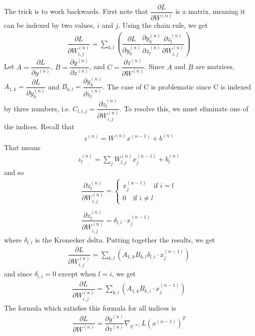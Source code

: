 \documentclass{article}
\begin{document}
 	The trick is to work backwards. First note that \( \dfrac{\partial L}{\partial W^{(n)}} \) is a matrix, meaning it can be indexed by two values, \( i \) and \( j \). Using the chain rule, we get 
 	\begin{gather*}
 		\dfrac{\partial L}{\partial W^{(n)}_{i, j}} = \sum_{k, l} \left( \dfrac{\partial L}{\partial y^{(n)}_k} \dfrac{\partial y^{(n)}_k}{\partial z^{(n)}_l} \dfrac{\partial z^{(n)}_l}{\partial W^{(n)}_{i, j}} \right)
 	\end{gather*}
 	Let \( A =  \dfrac{\partial L}{\partial y^{(n)}} \), \( B = \dfrac{\partial y^{(n)}}{\partial z^{(n)}} \), and \( C = \dfrac{\partial z^{(n)}}{\partial W^{(n)}} \). Since \( A \) and \( B \) are matrices, \( A_{1,k} =  \dfrac{\partial L}{\partial y^{(n)}_k} \) and \( B_{k, l} =  \dfrac{\partial y^{(n)}_k}{\partial z^{(n)}_l} \). The case of C is problematic since C is indexed by three numbers, i.e. \( C_{l, i, j} = \dfrac{\partial z^{(n)}_l}{\partial W^{(n)}_{i, j}} \). To resolve this, we must eliminate one of the indices. Recall that
 	\begin{gather*}
 		z^{(n)} = W^{(n)} x^{(n - 1)} + b^{(n)}
 	\end{gather*}
 	That means
 	\begin{gather*}
 		z^{(n)}_l = \sum_j W^{(n)}_{l, j} x^{(n - 1)}_j + b^{(n)}_l
 	\end{gather*}
 	and so
 	\begin{gather*}
 		\dfrac{\partial z^{(n)}_l}{\partial W^{(n)}_{i, j}}
 		= \begin{cases}
 			x^{(n - 1)}_j \quad \text{if } i = l \\
 			0 \quad \text{if } i \neq l
 		\end{cases} \\ \\
 		\dfrac{\partial z^{(n)}_l}{\partial W^{(n)}_{i, j}} = \delta_{l, i} \cdot x^{(n - 1)}_j	
 	\end{gather*}
 	where \( \delta_{l, i} \) is the Kronecker delta. Putting together the results, we get
 	\begin{gather*}
 		\dfrac{\partial L}{\partial W^{(n)}_{i, j}} = \sum_{k, l} \left( A_{1, k} B_{k, l} \delta_{l, i} \cdot x^{(n - 1)}_j \right)
 	\end{gather*}
 	and since \( \delta_{l, i} = 0 \) except when \( l = i \), we get
 	\begin{gather*}
 		\dfrac{\partial L}{\partial W^{(n)}_{i, j}} = \sum_{k, l} \left( A_{1, k} B_{k, i} \cdot x^{(n - 1)}_j \right)
 	\end{gather*} 	
 	The formula which satisfies this formula for all indices is
 	\begin{gather*}
 		\dfrac{\partial L}{\partial W^{(n)}} = \dfrac{\partial y^{(n)}}{\partial z^{(n)}} \nabla_{y^{(n)}}L  \left( x^{(n - 1)} \right)^T
 	\end{gather*}
 	
\end{document}
